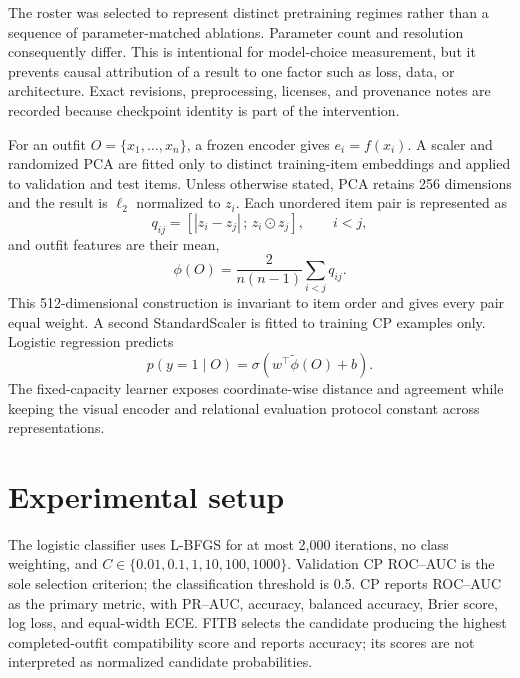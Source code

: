 \documentclass[preprint,12pt]{elsarticle}
\begin{document}
The roster was selected to represent distinct pretraining regimes rather than a sequence of parameter-matched ablations. Parameter count and resolution consequently differ. This is intentional for model-choice measurement, but it prevents causal attribution of a result to one factor such as loss, data, or architecture. Exact revisions, preprocessing, licenses, and provenance notes are recorded because checkpoint identity is part of the intervention.

For an outfit $O=\{x_1,\ldots,x_n\}$, a frozen encoder gives $e_i=f(x_i)$. A scaler and randomized PCA are fitted only to distinct training-item embeddings and applied to validation and test items. Unless otherwise stated, PCA retains 256 dimensions and the result is $\ell_2$ normalized to $z_i$. Each unordered item pair is represented as
\begin{equation}
q_{ij}=\left[|z_i-z_j|\,;\, z_i\odot z_j\right], \qquad i<j,
\label{eq:pair}
\end{equation}
and outfit features are their mean,
\begin{equation}
\phi(O)=\frac{2}{n(n-1)}\sum_{i<j}q_{ij}.
\label{eq:outfit}
\end{equation}
This 512-dimensional construction is invariant to item order and gives every pair equal weight. A second StandardScaler is fitted to training CP examples only. Logistic regression predicts
\begin{equation}
p(y=1\mid O)=\sigma(w^{\top}\tilde\phi(O)+b).
\end{equation}
The fixed-capacity learner exposes coordinate-wise distance and agreement while keeping the visual encoder and relational evaluation protocol constant across representations.

\section{Experimental setup}\label{sec:setup}

The logistic classifier uses L-BFGS for at most 2,000 iterations, no class weighting, and $C\in\{0.01,0.1,1,10,100,1000\}$. Validation CP ROC--AUC is the sole selection criterion; the classification threshold is 0.5. CP reports ROC--AUC as the primary metric, with PR--AUC, accuracy, balanced accuracy, Brier score, log loss, and equal-width ECE. FITB selects the candidate producing the highest completed-outfit compatibility score and reports accuracy; its scores are not interpreted as normalized candidate probabilities.
\end{document}
